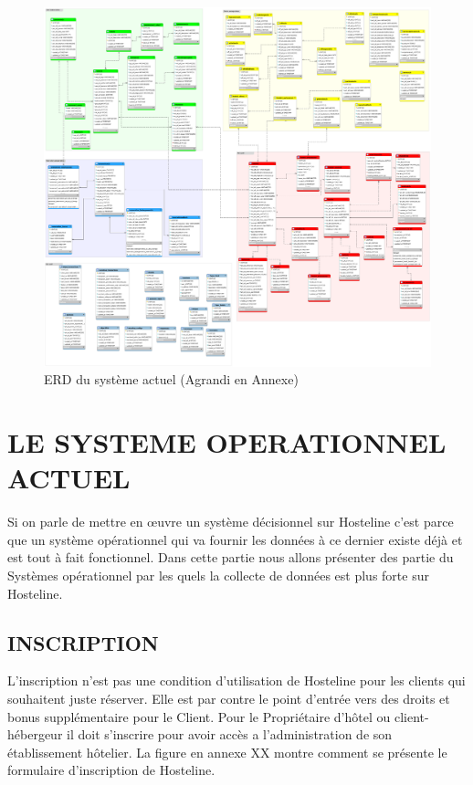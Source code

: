 \begin{figure}[!htbp]
	\begin{center}
		\includegraphics[scale=0.17]{images/diag_erd.png}
		\caption{ERD du système actuel (Agrandi en Annexe)}
		\label{classe_diagramme}
	\end{center}
\end{figure}

\cleardoublepage

\section{LE SYSTEME OPERATIONNEL ACTUEL}

Si on parle de mettre en œuvre un système décisionnel sur Hosteline c’est parce que un système opérationnel qui va fournir les données à ce dernier existe déjà et est tout à fait fonctionnel. Dans cette partie nous allons présenter des partie du Systèmes opérationnel par les quels la collecte de données est plus forte sur Hosteline.

\subsection{INSCRIPTION}	
L’inscription n’est pas une condition d’utilisation de Hosteline pour les clients qui souhaitent juste réserver. Elle est par contre le point d’entrée vers des droits et bonus supplémentaire pour le Client. Pour le Propriétaire d’hôtel ou client-hébergeur il doit s’inscrire pour avoir accès a l’administration de son établissement hôtelier. La figure en annexe XX montre comment se présente le formulaire d’inscription de Hosteline.

